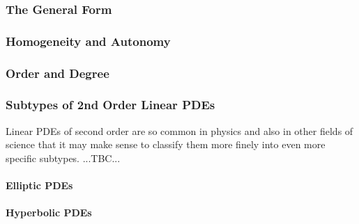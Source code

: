 \subsubsection{The General Form}



\subsubsection{Homogeneity and Autonomy}


\subsubsection{Order and Degree}




\subsubsection{Subtypes of 2nd Order Linear PDEs}
Linear PDEs of second order are so common in physics and also in other fields of science that it may make sense to classify them more finely into even more specific subtypes. ...TBC...



\paragraph{Elliptic PDEs}




\paragraph{Hyperbolic PDEs}




